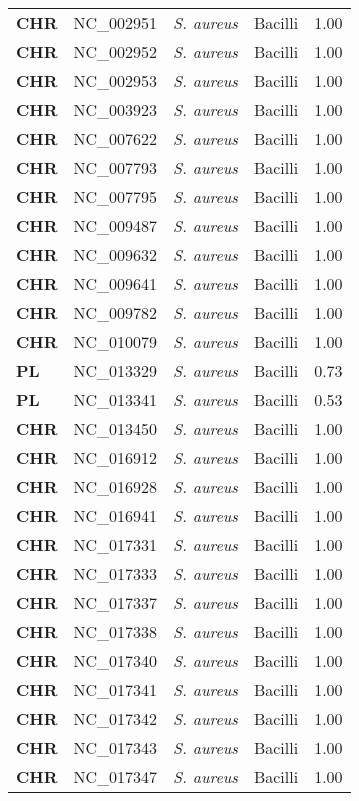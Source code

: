 \begin{adjustwidth}{-3cm}{2cm}
{\begin{supertabular}{>{\bfseries}l|p{0.1\textwidth}p{0.14\textwidth}l|l}
CHR & NC\_002951 & \textit{S. aureus} & Bacilli & 1.00\\
CHR & NC\_002952 & \textit{S. aureus} & Bacilli & 1.00\\
CHR & NC\_002953 & \textit{S. aureus} & Bacilli & 1.00\\
CHR & NC\_003923 & \textit{S. aureus} & Bacilli & 1.00\\
CHR & NC\_007622 & \textit{S. aureus} & Bacilli & 1.00\\
CHR & NC\_007793 & \textit{S. aureus} & Bacilli & 1.00\\
CHR & NC\_007795 & \textit{S. aureus} & Bacilli & 1.00\\
CHR & NC\_009487 & \textit{S. aureus} & Bacilli & 1.00\\
CHR & NC\_009632 & \textit{S. aureus} & Bacilli & 1.00\\
CHR & NC\_009641 & \textit{S. aureus} & Bacilli & 1.00\\
CHR & NC\_009782 & \textit{S. aureus} & Bacilli & 1.00\\
CHR & NC\_010079 & \textit{S. aureus} & Bacilli & 1.00\\
PL & NC\_013329 & \textit{S. aureus} & Bacilli & 0.73\\
PL & NC\_013341 & \textit{S. aureus} & Bacilli & 0.53\\
CHR & NC\_013450 & \textit{S. aureus} & Bacilli & 1.00\\
CHR & NC\_016912 & \textit{S. aureus} & Bacilli & 1.00\\
CHR & NC\_016928 & \textit{S. aureus} & Bacilli & 1.00\\
CHR & NC\_016941 & \textit{S. aureus} & Bacilli & 1.00\\
CHR & NC\_017331 & \textit{S. aureus} & Bacilli & 1.00\\
CHR & NC\_017333 & \textit{S. aureus} & Bacilli & 1.00\\
CHR & NC\_017337 & \textit{S. aureus} & Bacilli & 1.00\\
CHR & NC\_017338 & \textit{S. aureus} & Bacilli & 1.00\\
CHR & NC\_017340 & \textit{S. aureus} & Bacilli & 1.00\\
CHR & NC\_017341 & \textit{S. aureus} & Bacilli & 1.00\\
CHR & NC\_017342 & \textit{S. aureus} & Bacilli & 1.00\\
CHR & NC\_017343 & \textit{S. aureus} & Bacilli & 1.00\\
CHR & NC\_017347 & \textit{S. aureus} & Bacilli & 1.00\\

\end{supertabular}}
\end{adjustwidth}
